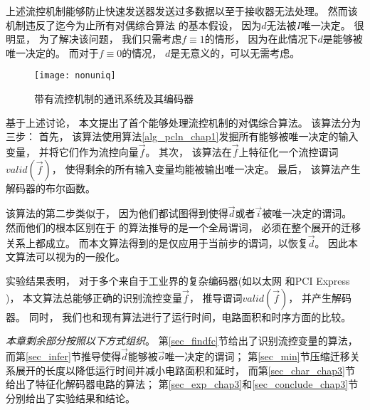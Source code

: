 上述流控机制能够防止快速发送器发送过多数据以至于接收器无法处理。
然而该机制违反了迄今为止所有对偶综合算法
的基本假设，
因为$d$无法被$I$唯一决定。
很明显，
为了解决该问题，
我们只需考虑$f\equiv 1$的情形，
因为在此情况下$d$是能够被唯一决定的。
而对于$f\equiv 0$的情况，
$d$是无意义的，可以无需考虑。

\begin{figure}
\centerline{\texttt{[image: nonuniq]}}
\caption{带有流控机制的通讯系统及其编码器}
\label{fig:nonuniq}
\end{figure}


基于上述讨论，
本文提出了首个能够处理流控机制的对偶综合算法。
该算法分为三步：
首先，
该算法使用算法\ref{alg_pcln_chap1}发掘所有能够被唯一决定的输入变量，
并将它们作为流控向量$\vec{f}$。
其次，
该算法在$\vec{f}$上特征化一个流控谓词$valid(\vec{f})$，
使得剩余的所有输入变量均能被输出唯一决定。
最后，
该算法产生解码器的布尔函数。

该算法的第二步类似于，
因为他们都试图得到使得$\vec{d}$或者$\vec{i}$被唯一决定的谓词。
然而他们的根本区别在于
的算法推导的是一个全局谓词，
必须在整个展开的迁移关系上都成立。
而本文算法得到的是仅应用于当前步的谓词，以恢复$\vec{d}$。
因此本文算法可以视为的一般化。

实验结果表明，
对于多个来自于工业界的复杂编码器(如以太网 和PCI Express )，
本文算法总能够正确的识别流控变量$\vec{f}$，
推导谓词$valid(\vec{f})$，
并产生解码器。
同时，
我们也和现有算法进行了运行时间，电路面积和时序方面的比较。



\emph{本章剩余部分按照以下方式组织}。
第\ref{sec_findfc}节给出了识别流控变量的算法，
而第\ref{sec_infer}节推导使得$\vec{d}$能够被$\vec{o}$唯一决定的谓词；
第\ref{sec_min}节压缩迁移关系展开的长度以降低运行时间并减小电路面积和延时，
而第\ref{sec_char_chap3}节给出了特征化解码器电路的算法；
第\ref{sec_exp_chap3}和\ref{sec_conclude_chap3}节分别给出了实验结果和结论。




